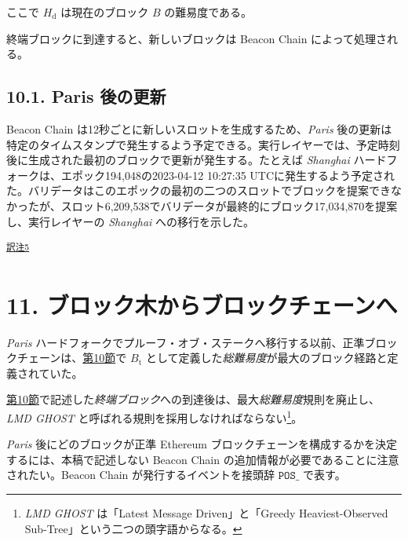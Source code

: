 \documentclass[
]{ltjsarticle}
\begin{document}
ここで \(H_{\mathrm{d}}\) は現在のブロック \(B\) の難易度である。

終端ブロックに到達すると、新しいブロックは Beacon Chain
によって処理される。

\hypertarget{paris-ux5f8cux306eux66f4ux65b0}{%
\subsection{10.1. Paris 後の更新}\label{paris-ux5f8cux306eux66f4ux65b0}}

Beacon Chain は12秒ごとに新しいスロットを生成するため、\emph{Paris}
後の更新は特定のタイムスタンプで発生するよう予定できる。実行レイヤーでは、予定時刻後に生成された最初のブロックで更新が発生する。たとえば
\emph{Shanghai} ハードフォークは、エポック194,048の2023-04-12 10:27:35
UTCに発生するよう予定された。バリデータはこのエポックの最初の二つのスロットでブロックを提案できなかったが、スロット6,209,538でバリデータが最終的にブロック17,034,870を提案し、実行レイヤーの
\emph{Shanghai} への移行を示した。

\protect\hypertarget{tnref-5}{}{}\textsuperscript{\protect\hyperlink{tn-5}{訳注5}}

\protect\hypertarget{ch:blocktree_to_blockchain}{}{}

\hypertarget{ux30d6ux30edux30c3ux30afux6728ux304bux3089ux30d6ux30edux30c3ux30afux30c1ux30a7ux30fcux30f3ux3078}{%
\section{11.
ブロック木からブロックチェーンへ}\label{ux30d6ux30edux30c3ux30afux6728ux304bux3089ux30d6ux30edux30c3ux30afux30c1ux30a7ux30fcux30f3ux3078}}

\emph{Paris}
ハードフォークでプルーフ・オブ・ステークへ移行する以前、正準ブロックチェーンは、\protect\hyperlink{ch:pos_transition}{第10節}で
\(B_{\mathrm{t}}\)
として定義した\emph{総難易度}が最大のブロック経路と定義されていた。

\protect\hyperlink{ch:pos_transition}{第10節}で記述した\emph{終端ブロック}への到達後は、最大\emph{総難易度}規則を廃止し、\emph{LMD
GHOST} と呼ばれる規則を採用しなければならない\footnote{\emph{LMD GHOST}
  は「Latest Message Driven」と「Greedy Heaviest-Observed
  Sub-Tree」という二つの頭字語からなる。}。

\emph{Paris} 後にどのブロックが正準 Ethereum
ブロックチェーンを構成するかを決定するには、本稿で記述しない Beacon
Chain の追加情報が必要であることに注意されたい。Beacon Chain
が発行するイベントを接頭辞 \(\mathtt{POS\_}\) で表す。
\end{document}
